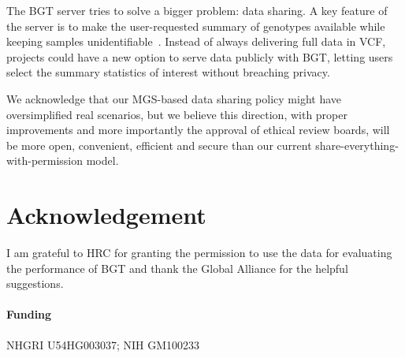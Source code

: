 \documentclass{bioinfo}
\begin{document}
The BGT server tries to solve a bigger problem: data sharing. A key feature of
the server is to make the user-requested summary of genotypes available while
keeping samples unidentifiable~\citep{Stade:2014ty}. Instead of always
delivering full data in VCF, projects could have a new option to serve data
publicly with BGT, letting users select the summary statistics of interest
without breaching privacy.


We acknowledge that our MGS-based data sharing policy might have oversimplified
real scenarios, but we believe this direction, with proper improvements and
more importantly the approval of ethical review boards, will be more open,
convenient, efficient and secure than our current
share-everything-with-permission model.

\section*{Acknowledgement}
I am grateful to HRC for granting the permission to use the data for evaluating
the performance of BGT and thank the Global Alliance for the helpful
suggestions.
\paragraph{Funding\textcolon} NHGRI U54HG003037; NIH GM100233


\end{document}
